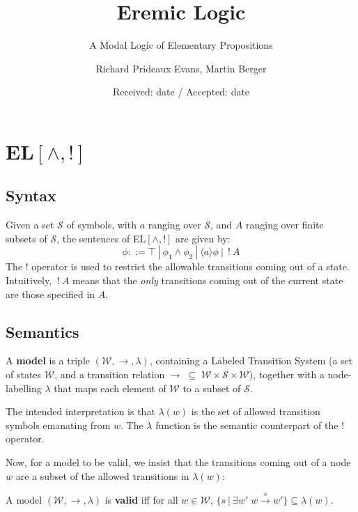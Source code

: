 \documentclass[smallextended]{svjour3}       %
\numberwithin{subcase}{mycase}
\def\fBang {\ ! \ }
\def\fOr {\ | \ }
\begin{document}
\title {Eremic Logic} 
\subtitle {A Modal Logic of Elementary Propositions}
\author{Richard Prideaux Evans,  Martin Berger}
\date{Received: date / Accepted: date}

\maketitle

\section{EL$[\land, !]$}
\subsection{Syntax}
Given a set $\mathcal{S}$ of symbols, with $a$ ranging over $\mathcal{S}$, and $A$ ranging over finite subsets of $\mathcal{S}$, the sentences of EL$[\land, !]$ are given by:
\[
\phi ::= \top \fOr \phi_1 \land \phi_2  \fOr \langle a \rangle \phi \fOr \fBang A 
\]
The $!$ operator is used to restrict the allowable transitions coming out of a state.
Intuitively, $\fBang A$ means that the \emph{only} transitions coming out of the current state are those specified in $A$.
\subsection{Semantics}
\begin{definition}
A {\bf model} is a triple $(\mathcal{W}, \rightarrow, \lambda)$, containing a Labeled Transition System (a set of states $\mathcal{W}$, and a transition relation $\rightarrow \; \subseteq \; \mathcal{W} \times \mathcal{S} \times \mathcal{W}$), together with a node-labelling $\lambda$ that maps each element of $\mathcal{W}$ to a subset of $\mathcal{S}$. 
\end{definition}
The intended interpretation is that $\lambda(w)$ is the set of allowed transition symbols emanating from $w$.
The $\lambda$ function is the semantic counterpart of the $!$ operator.

Now, for a model to be valid, we insist that the transitions coming out of a node $w$ are a subset of the allowed transitions in $\lambda(w)$:
\begin{definition}
A model $(\mathcal{W}, \rightarrow, \lambda)$ is {\bf valid} iff for all $w \in \mathcal{W}$, $ \{s \fOr \exists w' \; w \xrightarrow{s} w'\} \subseteq \lambda(w)$.
\end{definition}
\end{document}
